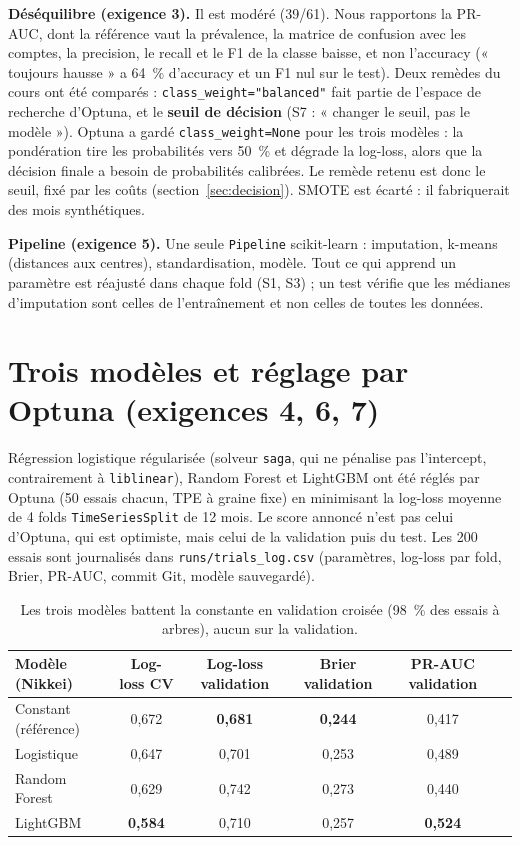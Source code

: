 \documentclass[11pt,a4paper]{article}
\begin{document}
\textbf{Déséquilibre (exigence 3).} Il est modéré (39/61). Nous rapportons la PR-AUC, dont la référence vaut la
prévalence, la matrice de confusion avec les comptes, la precision, le recall et le F1 de la classe baisse, et non
l'accuracy (« toujours hausse » a 64~\% d'accuracy et un F1 nul sur le test). Deux remèdes du cours ont été comparés :
\texttt{class\_weight="balanced"} fait partie de l'espace de recherche d'Optuna, et le \textbf{seuil de décision}
(S7 : « changer le seuil, pas le modèle »). Optuna a gardé \texttt{class\_weight=None} pour les trois modèles : la
pondération tire les probabilités vers 50~\% et dégrade la log-loss, alors que la décision finale a besoin de
probabilités calibrées. Le remède retenu est donc le seuil, fixé par les coûts (section~\ref{sec:decision}). SMOTE est
écarté : il fabriquerait des mois synthétiques.

\textbf{Pipeline (exigence 5).} Une seule \texttt{Pipeline} scikit-learn : imputation, k-means (distances aux
centres), standardisation, modèle. Tout ce qui apprend un paramètre est réajusté dans chaque fold (S1, S3) ; un test
vérifie que les médianes d'imputation sont celles de l'entraînement et non celles de toutes les données.

\section{Trois modèles et réglage par Optuna (exigences 4, 6, 7)}

Régression logistique régularisée (solveur \texttt{saga}, qui ne pénalise pas l'intercept, contrairement à
\texttt{liblinear}), Random Forest et LightGBM ont été réglés par Optuna (50 essais chacun, TPE à graine fixe) en
minimisant la log-loss moyenne de 4 folds \texttt{TimeSeriesSplit} de 12 mois. Le score annoncé n'est pas celui
d'Optuna, qui est optimiste, mais celui de la validation puis du test. Les 200 essais sont journalisés dans
\texttt{runs/trials\_log.csv} (paramètres, log-loss par fold, Brier, PR-AUC, commit Git, modèle sauvegardé).

\begin{table}[H]\centering\small
\begin{tabular}{lccccc}\toprule
Modèle (Nikkei) & Log-loss CV & Log-loss validation & Brier validation & PR-AUC validation \\\midrule
Constant (référence) & 0,672 & \textbf{0,681} & \textbf{0,244} & 0,417 \\
Logistique & 0,647 & 0,701 & 0,253 & 0,489 \\
Random Forest & 0,629 & 0,742 & 0,273 & 0,440 \\
LightGBM & \textbf{0,584} & 0,710 & 0,257 & \textbf{0,524} \\\bottomrule
\end{tabular}
\caption{Les trois modèles battent la constante en validation croisée (98~\% des essais à arbres), aucun sur la validation.}
\end{table}
\end{document}
